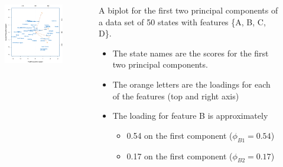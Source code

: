 \documentclass[
  ignorenonframetext,
  aspectratio=169,
]{beamer}
\begin{document}
\begin{frame}
\begin{columns}[T]
\begin{column}{0.6\textwidth}
\begin{figure}

{\centering \includegraphics[width=2.91667in,height=\textheight]{images/PCA.png}

}

\end{figure}
\end{column}

\begin{column}{0.4\textwidth}
A biplot for the first two principal components of a data set of 50
states with features \{A, B, C, D\}. \newline

\begin{itemize}
\item
  The state names are the scores for the first two principal components.
\item
  The orange letters are the loadings for each of the features (top and
  right axis)
\item
  The loading for feature B is approximately

  \begin{itemize}
  \item
    0.54 on the first component (\(\phi_{B1} = 0.54\))
  \item
    0.17 on the first component (\(\phi_{B2} = 0.17\))
  \end{itemize}
\end{itemize}
\end{column}
\end{columns}
\end{frame}
\end{document}
